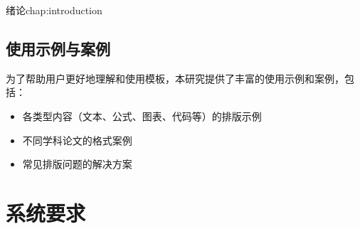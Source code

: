 \begin{cuzchapter}{绪论}{chap:introduction}
	\subsection{使用示例与案例}

	为了帮助用户更好地理解和使用模板，本研究提供了丰富的使用示例和案例，包括：

	\begin{itemize}
		\item 各类型内容（文本、公式、图表、代码等）的排版示例
		\item 不同学科论文的格式案例
		\item 常见排版问题的解决方案
	\end{itemize}

    \section{系统要求}\label{sec:system}


\end{cuzchapter}
